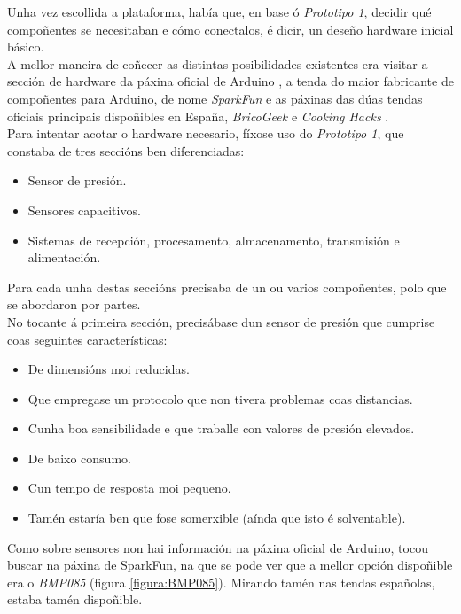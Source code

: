   Unha vez escollida a plataforma, había que, en base ó \textit{Prototipo 1},
  decidir qué compoñentes se necesitaban e cómo conectalos, é dicir, un deseño
  hardware inicial básico. \\

  A mellor maneira de coñecer as distintas posibilidades existentes era visitar
  a sección de hardware da páxina oficial de Arduino \cite{Arduino}, a tenda do
  maior fabricante de compoñentes para Arduino, de nome \textit{SparkFun}
  \cite{SparkFun} e as páxinas das dúas tendas oficiais principais dispoñibles
  en España, \textit{BricoGeek} \cite{BricoGeek} e \textit{Cooking Hacks}
  \cite{CookingHacks}. \\

  Para intentar acotar o hardware necesario, fíxose uso do
  \textit{Prototipo 1}, que constaba de tres seccións ben diferenciadas:

  \begin{itemize}
   \item Sensor de presión.
   \item Sensores capacitivos.
   \item Sistemas de recepción, procesamento, almacenamento, transmisión e
         alimentación.
  \end{itemize}

  Para cada unha destas seccións precisaba de un ou varios compoñentes, polo
  que se abordaron por partes. \\

  No tocante á primeira sección, precisábase dun sensor de presión que cumprise
  coas seguintes características:

  \begin{itemize}
   \item De dimensións moi reducidas.
   \item Que empregase un protocolo que non tivera problemas coas distancias.
   \item Cunha boa sensibilidade e que traballe con valores de presión
         elevados.
   \item De baixo consumo.
   \item Cun tempo de resposta moi pequeno.
   \item Tamén estaría ben que fose somerxible (aínda que isto é solventable).
  \end{itemize}

  Como sobre sensores non hai información na páxina oficial de Arduino, tocou
  buscar na páxina de SparkFun, na que se pode ver que a mellor opción
  dispoñible era o \textit{BMP085} \cite{BMP085} (figura \ref{figura:BMP085}).
  Mirando tamén nas tendas españolas, estaba tamén dispoñible. \\

